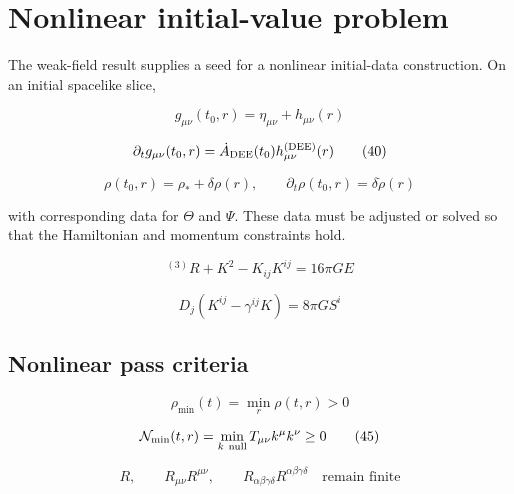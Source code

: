 \documentclass[aps,prd,preprint,nofootinbib,superscriptaddress]{revtex4-2}
\begin{document}
\section{Nonlinear initial-value problem}

The weak-field result supplies a seed for a nonlinear initial-data construction. On an initial spacelike slice,


\begin{equation}
g_{\mu\nu}(t_0,r)=\eta_{\mu\nu}+h_{\mu\nu}(r)
\tag{39}\label{eq:39}
\end{equation}

\begin{equation}
\partial_tg_{\mu\nu}(t_0,r)=\dot A_{\rm DEE}(t_0)h_{\mu\nu}^{({\rm DEE})}(r)
\tag{40}\label{eq:40}
\end{equation}

\begin{equation}
\rho(t_0,r)=\rho_*+\delta\rho(r),\qquad \partial_t\rho(t_0,r)=\delta\dot\rho(r)
\tag{41}\label{eq:41}
\end{equation}

with corresponding data for $\Theta$ and $\Psi$. These data must be adjusted or solved so that the Hamiltonian and momentum constraints hold.


\begin{equation}
{}^{(3)}R+K^2-K_{ij}K^{ij}=16\pi GE
\tag{42}\label{eq:42}
\end{equation}

\begin{equation}
D_j(K^{ij}-\gamma^{ij}K)=8\pi GS^i
\tag{43}\label{eq:43}
\end{equation}

\subsection{Nonlinear pass criteria}

\begin{equation}
\rho_{\min}(t)=\min_r\rho(t,r)>0
\tag{44}\label{eq:44}
\end{equation}

\begin{equation}
\mathcal N_{\min}(t,r)=\min_{k\ {\rm null}}T_{\mu\nu}k^\mu k^\nu\geq0
\tag{45}\label{eq:45}
\end{equation}

\begin{equation}
R,\qquad R_{\mu\nu}R^{\mu\nu},\qquad R_{\alpha\beta\gamma\delta}R^{\alpha\beta\gamma\delta}\quad\text{remain finite}
\tag{46}\label{eq:46}
\end{equation}
\end{document}
